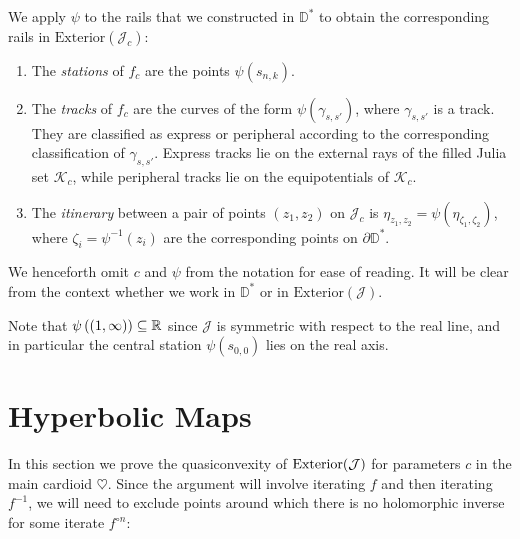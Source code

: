 We apply $\psi$ to the rails that we constructed in $\mathbb D^*$ 
to obtain the corresponding rails in $\mathrm{Exterior}(\mathcal{J}_c)$:
\begin{definition} \leavevmode
\begin{enumerate}
	\item The 	\emph{stations} of $f_c$ are the points $\psi(s_{n,k})$.


\item The \emph{tracks} of $f_c$ are the curves of the form $\psi \left(\gamma_{s,s'}\right)$, where $\gamma_{s,s'}$ is a track. They are classified as express or peripheral according to the corresponding classification of $\gamma_{s,s'}$. 
Express tracks lie on the external rays of the filled Julia set $\mathcal K_c$, while peripheral tracks lie on the equipotentials of $\mathcal K_c$.

\item The \emph{itinerary} between a pair of points $(z_1,z_2)$ on $\mathcal J_c$ is
$\eta_{z_1,z_2}=\psi(\eta_{\zeta_1,\zeta_2})$, 
where $\zeta_i=\psi^{-1}(z_i)$ are the corresponding points on $\partial \mathbb D^*$. 
\end{enumerate}

We henceforth omit $c$ and $\psi$ from the notation for ease of reading. It will be clear from the context whether we work in $\mathbb D^*$ or in $\mathrm{Exterior}(\mathcal J)$.

\end{definition}

Note that $\psi\left((1,\infty)\right)\subseteq\mathbb{R}$ since $\mathcal{J}$ is symmetric with respect to the real line, and in particular the central station $\psi(s_{0,0})$ lies on the real axis.


\section{Hyperbolic Maps}
In this section we prove the quasiconvexity of $\operatorname{Exterior}(\mathcal J)$ for parameters $c$ in the main cardioid $\heartsuit$.
Since the argument will involve iterating $f$ and then iterating $f^{-1}$, 
we will need to exclude points around which there is no holomorphic inverse for some iterate $f^{\circ n}$:

